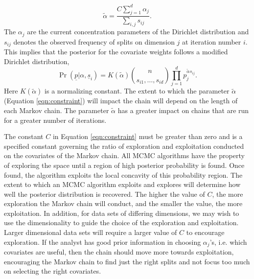 \begin{equation}\label{eqn:constraint}
\widetilde{\alpha} = \frac{C\sum_{j=1}^d\alpha_j}{\sum_{i,j}s_{ij}}.
\end{equation}
The $\alpha_j$ are the current concentration parameters of the Dirichlet distribution and $s_{ij}$ denotes the observed frequency of splits on dimension $j$ at iteration number $i$. This implies that the posterior for the covariate weights follows a modified Dirichlet distribution,
\begin{equation}\label{eqn:gen_dirichlet_dist}
\Pr(\underline{p}\vert \alpha, \underline{s}_i) = K(\widetilde{\alpha}){n\choose s_{i1}, \dots,s_{id}}\prod_{j=1}^dp_j^{\widetilde{\alpha}s_{ij}}.\nonumber
\end{equation}
Here $K(\widetilde{\alpha})$ is a normalizing constant. The extent to which the parameter $\widetilde{\alpha}$ (Equation \ref{eqn:constraint}) will impact the chain will depend on the length of each Markov chain. The parameter $\widetilde{\alpha}$ has a greater impact on chains that are run for a greater number of iterations.  

The constant $C$ in Equation \ref{eqn:constraint} must be greater than zero and is a specified constant governing the ratio of exploration and exploitation conducted on the covariates of the Markov chain. 
All MCMC algorithms have the property of exploring the space until a region of high posterior probability is found. Once found, the algorithm exploits the local concavity of this probability region. The extent to which an MCMC algorithm exploits and explores will determine how well the posterior distribution is recovered. The higher the value of $C$, the more exploration the Markov chain will conduct, and the smaller the value, the more exploitation.  In addition, for data sets of differing dimensions, we may wish to use the dimensionality to guide the choice of the exploration and exploitation. Larger dimensional data sets will require a larger value of $C$ to encourage exploration. If the analyst has good prior information in choosing $\alpha_j$'s, i.e. which covariates are useful, then the chain should move more towards exploitation, encouraging the Markov chain to find just the right splits and not focus too much on selecting the right covariates. 

